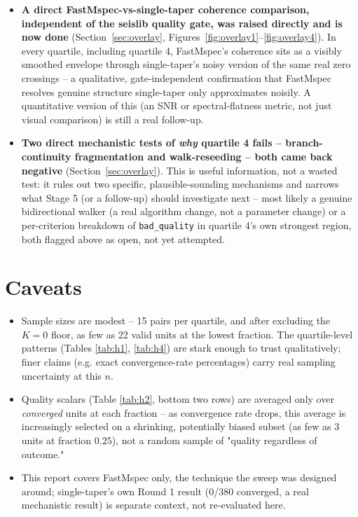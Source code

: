 \documentclass[11pt]{article}
\begin{document}
\begin{itemize}[nosep]
    itself is the clearest measured gap (0.41--0.56 vs.\ 0.888), but a mechanistic explanation for
    that gap -- beyond H3's existence-threshold story at the aggregate level -- is not yet in hand.
  \item \textbf{A direct FastMspec-vs-single-taper coherence comparison, independent of the
    seislib quality gate, was raised directly and is now done} (Section~\ref{sec:overlay},
    Figures~\ref{fig:overlay1}--\ref{fig:overlay4}). In every quartile, including quartile 4,
    FastMspec's coherence sits as a visibly smoothed envelope through single-taper's noisy version
    of the same real zero crossings -- a qualitative, gate-independent confirmation that FastMspec
    resolves genuine structure single-taper only approximates noisily. A quantitative version of
    this (an SNR or spectral-flatness metric, not just visual comparison) is still a real follow-up.
  \item \textbf{Two direct mechanistic tests of \emph{why} quartile 4 fails -- branch-continuity
    fragmentation and walk-reseeding -- both came back negative} (Section~\ref{sec:overlay}). This
    is useful information, not a wasted test: it rules out two specific, plausible-sounding
    mechanisms and narrows what Stage 5 (or a follow-up) should investigate next -- most likely a
    genuine bidirectional walker (a real algorithm change, not a parameter change) or a
    per-criterion breakdown of \texttt{bad\_quality} in quartile 4's own strongest region, both
    flagged above as open, not yet attempted.
\end{itemize}

\section{Caveats}

\begin{itemize}[nosep]
  \item Sample sizes are modest -- 15 pairs per quartile, and after excluding the $K=0$ floor,
    as few as 22 valid units at the lowest fraction. The quartile-level patterns (Tables
    \ref{tab:h1}, \ref{tab:h4}) are stark enough to trust qualitatively; finer claims (e.g. exact
    convergence-rate percentages) carry real sampling uncertainty at this $n$.
  \item Quality scalars (Table \ref{tab:h2}, bottom two rows) are averaged only over
    \emph{converged} units at each fraction -- as convergence rate drops, this average is
    increasingly selected on a shrinking, potentially biased subset (as few as 3 units at
    fraction $0.25$), not a random sample of "quality regardless of outcome."
  \item This report covers FastMspec only, the technique the sweep was designed around;
    single-taper's own Round 1 result (0/380 converged, a real mechanistic result) is separate
    context, not re-evaluated here.
\end{itemize}
\end{document}
